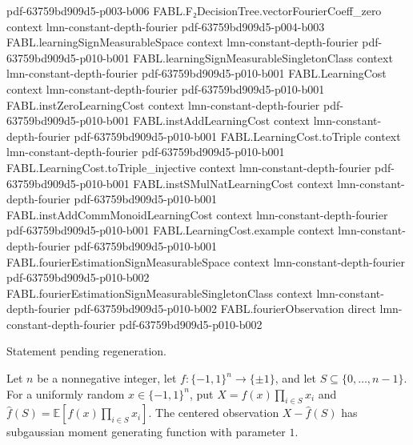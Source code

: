 \begin{theorem}
  {pdf-63759bd909d5-p003-b006}
\proofstep
  {FABL.F₂DecisionTree.vectorFourierCoeff_zero}
  {context}
  {lmn-constant-depth-fourier}
  {pdf-63759bd909d5-p004-b003}
\proofstep
  {FABL.learningSignMeasurableSpace}
  {context}
  {lmn-constant-depth-fourier}
  {pdf-63759bd909d5-p010-b001}
\proofstep
  {FABL.learningSignMeasurableSingletonClass}
  {context}
  {lmn-constant-depth-fourier}
  {pdf-63759bd909d5-p010-b001}
\proofstep
  {FABL.LearningCost}
  {context}
  {lmn-constant-depth-fourier}
  {pdf-63759bd909d5-p010-b001}
\proofstep
  {FABL.instZeroLearningCost}
  {context}
  {lmn-constant-depth-fourier}
  {pdf-63759bd909d5-p010-b001}
\proofstep
  {FABL.instAddLearningCost}
  {context}
  {lmn-constant-depth-fourier}
  {pdf-63759bd909d5-p010-b001}
\proofstep
  {FABL.LearningCost.toTriple}
  {context}
  {lmn-constant-depth-fourier}
  {pdf-63759bd909d5-p010-b001}
\proofstep
  {FABL.LearningCost.toTriple_injective}
  {context}
  {lmn-constant-depth-fourier}
  {pdf-63759bd909d5-p010-b001}
\proofstep
  {FABL.instSMulNatLearningCost}
  {context}
  {lmn-constant-depth-fourier}
  {pdf-63759bd909d5-p010-b001}
\proofstep
  {FABL.instAddCommMonoidLearningCost}
  {context}
  {lmn-constant-depth-fourier}
  {pdf-63759bd909d5-p010-b001}
\proofstep
  {FABL.LearningCost.example}
  {context}
  {lmn-constant-depth-fourier}
  {pdf-63759bd909d5-p010-b001}
\proofstep
  {FABL.fourierEstimationSignMeasurableSpace}
  {context}
  {lmn-constant-depth-fourier}
  {pdf-63759bd909d5-p010-b002}
\proofstep
  {FABL.fourierEstimationSignMeasurableSingletonClass}
  {context}
  {lmn-constant-depth-fourier}
  {pdf-63759bd909d5-p010-b002}
\proofstep
  {FABL.fourierObservation}
  {direct}
  {lmn-constant-depth-fourier}
  {pdf-63759bd909d5-p010-b002}

Statement pending regeneration.
\end{theorem}

\begin{theorem}
\label{FABL.fourierObservation_hasSubgaussianMGF}
\leanok
{}
Let $n$ be a nonnegative integer, let $f:\{-1,1\}^n\to\{\pm1\}$, and let
$S\subseteq\{0,\ldots,n-1\}$. For a uniformly random $x\in\{-1,1\}^n$, put
$X=f(x)\prod_{i\in S}x_i$ and $\widehat f(S)=\mathbb E[f(x)\prod_{i\in S}x_i]$. The
centered observation $X-\widehat f(S)$ has subgaussian moment generating function with
parameter $1$.
\end{theorem}

